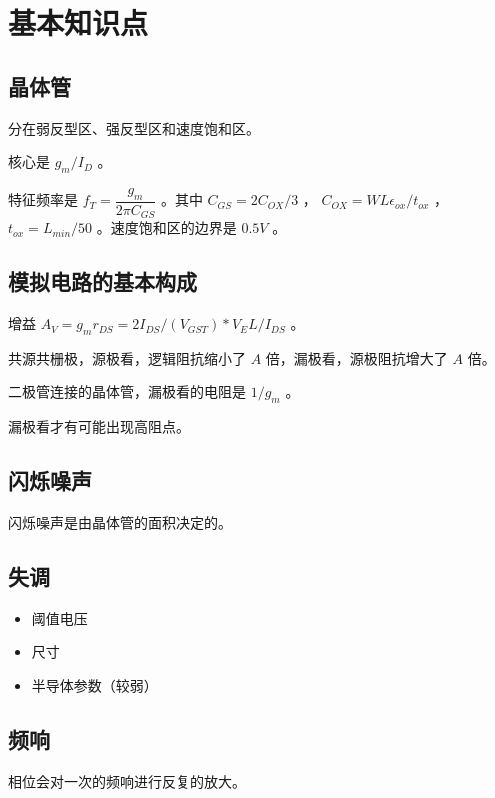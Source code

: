 \documentclass[cn,11pt,chinese,black,simple]{../elegantbook}
\begin{document}
\fi 
\def\chapname{CALLBACK}

\chapter{基本知识点}

\section{晶体管}

分在弱反型区、强反型区和速度饱和区。

核心是 \(g_m / I_{D}\) 。

特征频率是 \(f_T = \dfrac{g_m}{2 \pi C_{GS}}\) 。其中 \(C_{GS} = 2 C_{OX} / 3\) ， \(C_{OX} = WL \epsilon_{ox} / t_{ox}\) ， \(t_{ox} = L_{min} / 50\) 。速度饱和区的边界是 \(0.5 V\) 。

\section{模拟电路的基本构成}

增益 \(A_V = g_m r_{DS} = 2 I_{DS} / (V_{GST}) * V_E L / I_{DS} \) 。

共源共栅极，源极看，逻辑阻抗缩小了 \(A\) 倍，漏极看，源极阻抗增大了 \(A\) 倍。

二极管连接的晶体管，漏极看的电阻是 \(1 / g_m\) 。

漏极看才有可能出现高阻点。

\section{闪烁噪声}

闪烁噪声是由晶体管的面积决定的。


\section{失调}

\begin{itemize}
    \item 阈值电压
    \item 尺寸
    \item 半导体参数（较弱）
\end{itemize}

\section{频响}

相位会对一次的频响进行反复的放大。

\let\chapname\undefined
\ifx\mainclass\undefined
\end{document}
